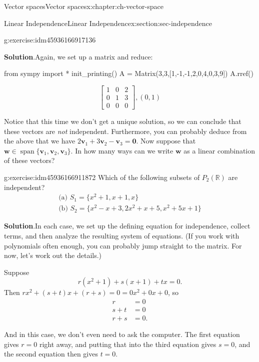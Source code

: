 \documentclass[oneside,10pt,]{book}
\newcommand{\blocktitlefont}{\relax}
\numberwithin{equation}{section}
\newcommand{\spn}{\operatorname{span}}
\newcommand{\bbm}{\begin{bmatrix}}
\newcommand{\ebm}{\end{bmatrix}}
\newcommand{\vv}{\mathbf{v}}
\newcommand{\ww}{\mathbf{w}}
\newcommand{\amp}{&}
\begin{document}
\begin{chapterptx}{Vector spaces}{}{Vector spaces}{}{}{x:chapter:ch-vector-space}
\begin{sectionptx}{Linear Independence}{}{Linear Independence}{}{}{x:section:sec-independence}
\begin{inlineexercise}{}{g:exercise:idm45936166917136}
\par\smallskip%
\noindent\textbf{\blocktitlefont Solution}.\label{g:solution:idm45936166915584}{}\hypertarget{g:solution:idm45936166915584}{}\quad{}Again, we set up a matrix and reduce:%
\begin{sageinput}
from sympy import *
init_printing()
A = Matrix(3,3,[1,-1,-1,2,0,4,0,3,9])
A.rref()
\end{sageinput}
\begin{sageoutput}
\[\bbm 1\amp 0\amp 2\\0\amp 1\amp 3\\0\amp 0\amp 0\ebm, (0,1)\]
\end{sageoutput}
Notice that this time we don't get a unique solution, so we can conclude that these vectors are \emph{not} independent. Furthermore, you can probably deduce from the above that we have \(2\vv_1+3\vv_2-\vv_3=\mathbf{0}\). Now suppose that \(\ww\in\spn\{\vv_1,\vv_2,\vv_3\}\). In how many ways can we write \(\ww\) as a linear combination of these vectors?%
\end{inlineexercise}%
\begin{inlineexercise}{}{g:exercise:idm45936166911872}%
Which of the following subsets of \(P_2(\mathbb{R})\) are independent?%
\begin{gather*}
\text{(a) } S_1 = \{x^2+1, x+1, x\}\\
\text{(b) } S_2 = \{x^2-x+3, 2x^2+x+5, x^2+5x+1\}
\end{gather*}
%
\par\smallskip%
\noindent\textbf{\blocktitlefont Solution}.\label{g:solution:idm45936166909792}{}\hypertarget{g:solution:idm45936166909792}{}\quad{}In each case, we set up the defining equation for independence, collect terms, and then analyze the resulting system of equations. (If you work with polynomials often enough, you can probably jump straight to the matrix. For now, let's work out the details.)%
\par
Suppose%
\begin{equation*}
r(x^2+1)+s(x+1)+tx = 0\text{.}
\end{equation*}
Then \(rx^2+(s+t)x+(r+s)=0=0x^2+0x+0\), so%
\begin{align*}
r \amp =0\\
s+t \amp =0\\
r+s\amp =0\text{.}
\end{align*}
%
\par
And in this case, we don't even need to ask the computer. The first equation gives \(r=0\) right away, and putting that into the third equation gives \(s=0\), and the second equation then gives \(t=0\).%

\end{inlineexercise}
\end{sectionptx}
\end{chapterptx}
\end{document}
